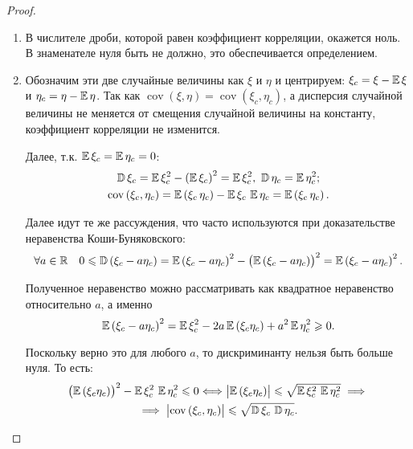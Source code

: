 \begin{proof}
    \begin{enumerate}
    \item 
        В числителе дроби, которой равен коэффициент корреляции,
        окажется ноль. В знаменателе нуля быть не должно, это обеспечивается определением.

    \item 
        Обозначим эти две случайные величины как $\xi$ и $\eta$ и центрируем: $\xi_c = \xi - \operatorname{\mathbb{E}} \xi$ и $\eta_c = \eta - \operatorname{\mathbb{E}} \eta$. 
        Так как $\operatorname{cov}(\xi, \eta)=\operatorname{cov}\left(\xi_{c}, \eta_{c}\right)$, а дисперсия случайной величины не меняется от смещения случайной величины на константу, коэффициент корреляции не изменится.
        
        Далее, т.к. $\operatorname{\mathbb{E}} \xi_{c}=\operatorname{\mathbb{E}} \eta_{c}=0$:
        \begin{gather*}
            \operatorname{\mathbb{D}} \xi_{c}=\operatorname{\mathbb{E}} \xi_{c}^{2}-\left(\operatorname{\mathbb{E}} \xi_{c}\right)^{2}=\operatorname{\mathbb{E}} \xi_{c}^{2},~ \operatorname{\mathbb{D}} \eta_{c}=\operatorname{\mathbb{E}} \eta_{c}^{2}; \\
            \operatorname{cov}\left(\xi_{c}, \eta_{c}\right)=\operatorname{\mathbb{E}} \left(\xi_{c} \, \eta_{c}\right) - \operatorname{\mathbb{E}} \xi_{c} \, \operatorname{\mathbb{E}} \eta_{c}=\operatorname{\mathbb{E}} \left(\xi_{c} \, \eta_{c}\right).
        \end{gather*}
        
        Далее идут те же рассуждения, что часто используются при доказательстве неравенства Коши-Буняковского:
        \begin{equation*}
            \forall a \in \mathbb{R} \quad 0 \leqslant \operatorname{\mathbb{D}}\left(\xi_{c}-a \eta_{c}\right) = 
            \operatorname{\mathbb{E}} \left(\xi_{c} - a \eta_{c}\right)^{2} - \bigl(\operatorname{\mathbb{E}} \left(\xi_{c}-a \eta_{c}\right)\bigr)^{2} = 
            \operatorname{\mathbb{E}} \left(\xi_{c}-a \eta_{c}\right)^{2}.
        \end{equation*}
        
        Полученное неравенство можно рассматривать как квадратное неравенство относительно $a$, а именно
        \begin{equation*}
            \operatorname{\mathbb{E}} \left(\xi_{c}-a \eta_{c}\right)^{2}=\operatorname{\mathbb{E}} \xi_{c}^{2}-2 a \operatorname{\mathbb{E}} \left(\xi_{c} \eta_{c}\right)+a^{2} \operatorname{\mathbb{E}} \eta_{c}^{2} \geqslant 0.
        \end{equation*}
        
        Поскольку верно это для любого $a$, то дискриминанту нельзя быть больше нуля. То есть:
        \begin{multline*}
            \bigl(\operatorname{\mathbb{E}} \left(\xi_{c} \eta_{c}\right) \bigr)^{2} - \operatorname{\mathbb{E}} \xi_{c}^{2} \, \operatorname{\mathbb{E}} \eta_{c}^{2} \leqslant 0 \Longleftrightarrow \bigl|\operatorname{\mathbb{E}} \left(\xi_{c} \eta_{c}\right)\bigr| \leqslant \sqrt{\operatorname{\mathbb{E}} \xi_{c}^{2} \, \operatorname{\mathbb{E}} \eta_{c}^{2}} \implies \\
            \implies \bigl|\operatorname{cov}\left(\xi_{c}, \eta_{c}\right)\bigr| \leqslant \sqrt{\operatorname{\mathbb{D}} \xi_{c} \, \operatorname{\mathbb{D}} \eta_{c}}.
        \end{multline*}
        

\end{enumerate}
\end{proof}
